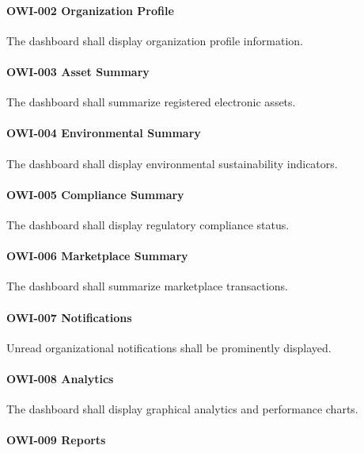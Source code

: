 \paragraph{OWI-002 Organization Profile}

The dashboard shall display organization profile information.

\paragraph{OWI-003 Asset Summary}

The dashboard shall summarize registered electronic assets.

\paragraph{OWI-004 Environmental Summary}

The dashboard shall display environmental sustainability indicators.

\paragraph{OWI-005 Compliance Summary}

The dashboard shall display regulatory compliance status.

\paragraph{OWI-006 Marketplace Summary}

The dashboard shall summarize marketplace transactions.

\paragraph{OWI-007 Notifications}

Unread organizational notifications shall be prominently displayed.

\paragraph{OWI-008 Analytics}

The dashboard shall display graphical analytics and performance charts.

\paragraph{OWI-009 Reports}

